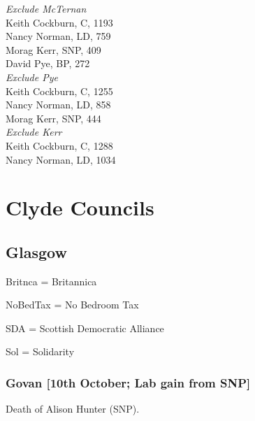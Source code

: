 \documentclass[a4paper,openany,10pt]{book}
\begin{document}
\emph{Exclude McTernan}\\
Keith Cockburn, C, 1193\\
Nancy Norman, LD, 759\\
Morag Kerr, SNP, 409\\
David Pye, BP, 272\\




\emph{Exclude Pye}\\
Keith Cockburn, C, 1255\\
Nancy Norman, LD, 858\\
Morag Kerr, SNP, 444\\




\emph{Exclude Kerr}\\
Keith Cockburn, C, 1288\\
Nancy Norman, LD, 1034\\



\section[Clyde Councils]{{Clyde Councils}}

\subsection*{Glasgow}

Britnca = Britannica

NoBedTax = No Bedroom Tax

SDA = Scottish Democratic Alliance

Sol = Solidarity

\subsubsection*{Govan \hspace*{\fill}\nolinebreak[1]%
\enspace\hspace*{\fill}
[10th October; Lab gain from SNP]}


Death of Alison Hunter (SNP).
\end{document}
